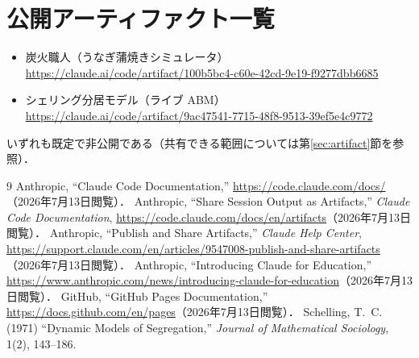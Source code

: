 \documentclass[a4paper]{jlreq}
\begin{document}
\appendix

\section{公開アーティファクト一覧}

\begin{itemize}
  \item 炭火職人（うなぎ蒲焼きシミュレータ）\\
    \url{https://claude.ai/code/artifact/100b5bc4-c60e-42cd-9e19-f9277dbb6685}
  \item シェリング分居モデル（ライブ ABM）\\
    \url{https://claude.ai/code/artifact/9ac47541-7715-48f8-9513-39ef5e4c9772}
\end{itemize}

いずれも既定で非公開である（共有できる範囲については第\ref{sec:artifact}節を参照）．

\begin{thebibliography}{9}
Anthropic, ``Claude Code Documentation,''
\url{https://code.claude.com/docs/}（2026年7月13日閲覧）．
Anthropic, ``Share Session Output as Artifacts,''
\textit{Claude Code Documentation},
\url{https://code.claude.com/docs/en/artifacts}（2026年7月13日閲覧）．
Anthropic, ``Publish and Share Artifacts,''
\textit{Claude Help Center},
\url{https://support.claude.com/en/articles/9547008-publish-and-share-artifacts}（2026年7月13日閲覧）．
Anthropic, ``Introducing Claude for Education,''
\url{https://www.anthropic.com/news/introducing-claude-for-education}（2026年7月13日閲覧）．
GitHub, ``GitHub Pages Documentation,''
\url{https://docs.github.com/en/pages}（2026年7月13日閲覧）．
Schelling, T.~C. (1971) ``Dynamic Models of Segregation,''
\textit{Journal of Mathematical Sociology}, 1(2), 143--186.
\end{thebibliography}
\end{document}
